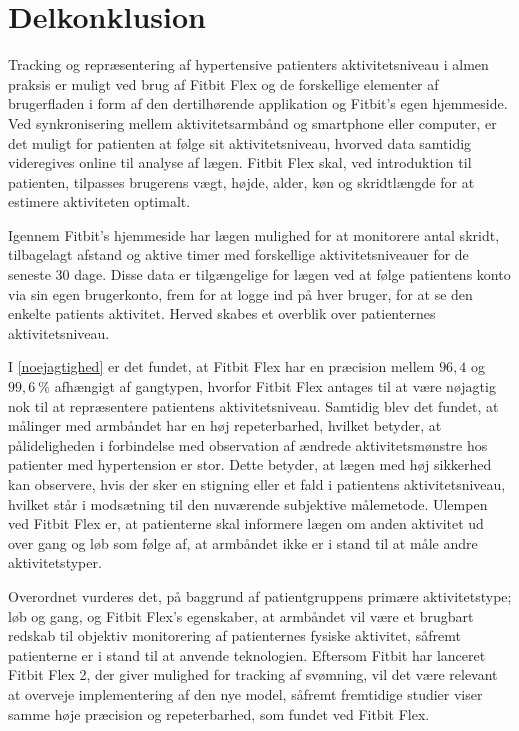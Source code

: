 \section{Delkonklusion}

Tracking og repræsentering af hypertensive patienters aktivitetsniveau i almen praksis er muligt ved brug af Fitbit Flex og de forskellige elementer af brugerfladen i form af den dertilhørende applikation og Fitbit's egen hjemmeside. Ved synkronisering mellem aktivitetsarmbånd og smartphone eller computer, er  det muligt for patienten at følge sit aktivitetsniveau, hvorved data samtidig videregives online til analyse af lægen. Fitbit Flex skal, ved introduktion til patienten, tilpasses brugerens vægt, højde, alder, køn og skridtlængde for at estimere aktiviteten optimalt.

Igennem Fitbit's hjemmeside har lægen mulighed for at monitorere antal skridt, tilbagelagt afstand og aktive timer med forskellige aktivitetsniveauer for de seneste $30$ dage. Disse data er tilgængelige for lægen ved at følge patientens konto via sin egen brugerkonto, frem for at logge ind på hver bruger, for at se den enkelte patients aktivitet. Herved skabes et overblik over patienternes aktivitetsniveau. 

I \autoref{noejagtighed} er det fundet, at Fitbit Flex har en præcision mellem $96,4$ og $99,6~\%$ afhængigt af gangtypen, hvorfor Fitbit Flex antages til at være nøjagtig nok til at repræsentere  patientens aktivitetsniveau. Samtidig blev det fundet, at målinger med armbåndet har en høj repeterbarhed, hvilket betyder, at pålideligheden i forbindelse med observation af ændrede aktivitetsmønstre hos patienter med hypertension er stor. Dette  betyder, at lægen med høj sikkerhed kan observere, hvis der sker en stigning eller et fald i patientens aktivitetsniveau, hvilket står i modsætning til den nuværende subjektive målemetode. 
Ulempen ved Fitbit Flex er, at patienterne skal informere lægen om anden aktivitet ud over gang og løb som følge af, at armbåndet ikke er i stand til at måle andre aktivitetstyper.

Overordnet vurderes det, på baggrund af patientgruppens primære aktivitetstype; løb og gang, og Fitbit Flex's egenskaber, at armbåndet vil være et brugbart redskab til objektiv monitorering af patienternes fysiske aktivitet, såfremt patienterne er i stand til at anvende teknologien.  Eftersom Fitbit har lanceret Fitbit Flex 2, der giver mulighed for tracking af svømning, vil det være relevant at overveje implementering af den nye model, såfremt fremtidige studier viser samme høje præcision og repeterbarhed, som fundet ved Fitbit Flex.